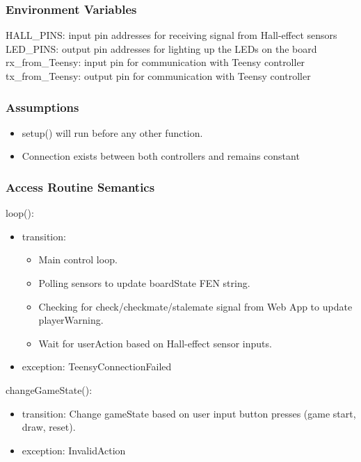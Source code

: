 \documentclass[12pt, titlepage]{article}
\begin{document}
\subsubsection{Environment Variables}{
  HALL\_PINS: input pin addresses for receiving signal from Hall-effect sensors\\
  LED\_PINS: output pin addresses for lighting up the LEDs on the board\\
  rx\_from\_Teensy: input pin for communication with Teensy controller\\
  tx\_from\_Teensy: output pin for communication with Teensy controller\\
}

\subsubsection{Assumptions}{
  \begin{itemize}
    \item setup() will run before any other function.
    \item Connection exists between both controllers and remains constant
  \end{itemize}
  
}

\subsubsection{Access Routine Semantics}

\noindent loop():
\begin{itemize}
\item transition: \begin{itemize}
  \item Main control loop.
  \item Polling sensors to update boardState FEN string.
  \item Checking for check/checkmate/stalemate signal from Web App to update playerWarning.
  \item Wait for userAction based on Hall-effect sensor inputs.
\end{itemize}
\item exception: TeensyConnectionFailed
\end{itemize}

\noindent changeGameState():
\begin{itemize}
\item transition: Change gameState based on user input button presses (game start, draw, reset).
\item exception: InvalidAction
\end{itemize}
\end{document}
